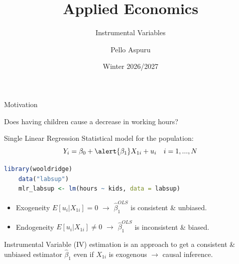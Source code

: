 \documentclass[9pt,aspectratio=169, xcolor=dvipsnames]{beamer}
\title{Applied Economics}
\subtitle{Instrumental Variables}
\author{Pello Aspuru}
\date{Winter 2026/2027}
\begin{document}
%

{
  \begin{frame}
    \titlepage
  \end{frame}
}

\begin{frame}[fragile]{Motivation}

\begin{center}
    Does having children \alert{cause} a decrease in working hours?
\end{center}
\pause
Single Linear Regression Statistical model for the population:
\[
Y_{i} = \beta_0 + \alert{\beta_1} X_{1i} + u_i \quad i=1,...,N
\]
\begin{lstlisting}[language=R]
    library(wooldridge)
    data("labsup")
    mlr_labsup <- lm(hours ~ kids, data = labsup)
\end{lstlisting}
\pause

\begin{itemize}
    \item Exogeneity $E[u_i | X_{1i}] = 0$ \pause $\rightarrow$ \alert{$\hat{\beta}_1^{OLS}$} is consistent \& unbiased.
    \item Endogeneity $E[u_i | X_{1i}] \neq 0$ \pause $\rightarrow$ \alert{$\hat{\beta}_1^{OLS}$} is inconsistent \& biased.
\end{itemize}
\pause
Instrumental Variable (IV) estimation is an approach to get a consistent \& unbiased estimator \alert{$\hat{\beta}_1$} even if $X_{1i}$ is exogenous \pause $\rightarrow$ causal inference.
\end{frame}
\end{document}
